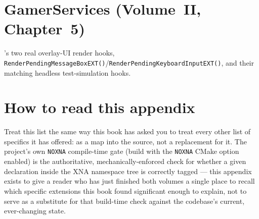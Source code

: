 \section{GamerServices (Volume~II, Chapter~5)}

's two real overlay-UI render hooks,
\texttt{RenderPendingMessageBoxEXT()}/\texttt{RenderPendingKeyboardInputEXT()}, and their
matching headless test-simulation hooks.

\section{How to read this appendix}

Treat this list the same way this book has asked you to treat every other list of specifics
it has offered: as a map into the source, not a replacement for it. The project's own
\texttt{NOXNA} compile-time gate (build with the \texttt{NOXNA} CMake option enabled) is the
authoritative, mechanically-enforced check for whether a given declaration inside the XNA
namespace tree is correctly tagged --- this appendix exists to give a reader who has just
finished both volumes a single place to recall which specific extensions this book found
significant enough to explain, not to serve as a substitute for that build-time check against
the codebase's current, ever-changing state.
